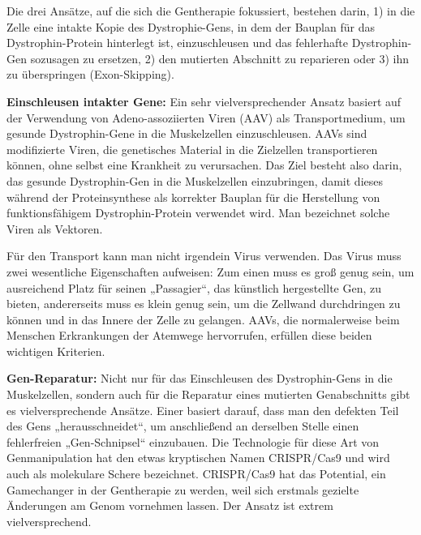 \documentclass[fontsize=14pt,a4paper,headinclude,DIV=calc,automark]{scrbook}
\begin{document}
Die drei Ansätze, auf die sich die Gentherapie fokussiert, bestehen darin, 1) in die Zelle eine intakte Kopie des Dystrophie-Gens, in dem der Bauplan für das Dystrophin-Protein hinterlegt ist, einzuschleusen und das fehlerhafte Dystrophin-Gen sozusagen zu ersetzen, 2) den mutierten Abschnitt zu reparieren oder 3) ihn zu überspringen (Exon-Skipping).

\vspace{0.5\baselineskip}

\noindent \textbf{Einschleusen intakter Gene:} Ein sehr vielversprechender Ansatz basiert auf der Verwendung von Adeno-assoziierten Viren (AAV) als Transportmedium, um gesunde Dystrophin-Gene in die Muskelzellen einzuschleusen. AAVs sind modifizierte Viren, die genetisches Material in die Zielzellen transportieren können, ohne selbst eine Krankheit zu verursachen. Das Ziel besteht also darin, das gesunde Dystrophin-Gen in die Muskelzellen einzubringen, damit dieses während der Proteinsynthese als korrekter Bauplan für die Herstellung von funktionsfähigem Dystrophin-Protein verwendet wird. Man bezeichnet solche Viren als Vektoren.

\noindent Für den Transport kann man nicht irgendein Virus verwenden. Das Virus muss zwei wesentliche Eigenschaften aufweisen: Zum einen muss es groß genug sein, um ausreichend Platz für seinen „Passagier“, das künstlich hergestellte Gen, zu bieten, andererseits muss es klein genug sein, um die Zellwand durchdringen zu können und in das Innere der Zelle zu gelangen. AAVs, die normalerweise beim Menschen Erkrankungen der Atemwege hervorrufen, erfüllen diese beiden wichtigen Kriterien.

\vspace{0.5\baselineskip}

\noindent \textbf{Gen-Reparatur:} Nicht nur für das Einschleusen des Dystrophin-Gens in die Muskelzellen, sondern auch für die Reparatur eines mutierten Genabschnitts gibt es vielversprechende Ansätze. Einer basiert darauf, dass man den defekten Teil des Gens „herausschneidet“, um anschließend an derselben Stelle einen fehlerfreien „Gen-Schnipsel“ einzubauen. Die Technologie für diese Art von Genmanipulation hat den etwas kryptischen Namen CRISPR/Cas9 und wird auch als molekulare Schere bezeichnet. CRISPR/Cas9 hat das Potential, ein Gamechanger in der Gentherapie zu werden, weil sich erstmals gezielte Änderungen am Genom vornehmen lassen. Der Ansatz ist extrem vielversprechend.


\vspace{0.5\baselineskip}
\end{document}
